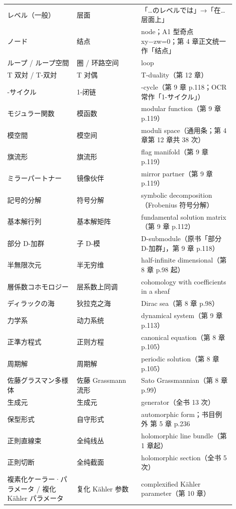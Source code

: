 \begin{longtable}{@{}>{\raggedright\arraybackslash}p{0.29\linewidth}>{\raggedright\arraybackslash}p{0.26\linewidth}>{\raggedright\arraybackslash}p{0.38\linewidth}@{}}
レベル（一般） & \mbox{层面} & 「…のレベルでは」→「在…层面上」 \\
ノード & \mbox{结点} & node；A1 型奇点 xy−zw=0；第 4 章正文统一作「结点」 \\
ループ / ループ空間 & \mbox{圈} / \mbox{环路空间} & loop \\
T 双対 / T-双対 & T \mbox{对偶} & T-duality（第 12 章） \\
1-サイクル & \mbox{1-闭链} & 1-cycle（第 9 章 p.118；OCR 常作「1-サイクル」） \\
モジュラー関数 & \mbox{模函数} & modular function（第 9 章 p.119） \\
模空間 & \mbox{模空间} & moduli space（通用条；第 4 章\textendash{}第 12 章共 38 次） \\
旗流形 & \mbox{旗流形} & flag manifold（第 9 章 p.119） \\
ミラーパートナー & \mbox{镜像伙伴} & mirror partner（第 9 章 p.119） \\
記号的分解 & \mbox{符号分解} & symbolic decomposition（Frobenius 符号分解） \\
基本解行列 & \mbox{基本解矩阵} & fundamental solution matrix（第 9 章 p.112） \\
部分 D-加群 & \mbox{子} \mbox{D-模} & D-submodule（原书「部分 D-加群」，第 9 章 p.118） \\
半無限次元 & \mbox{半无穷维} & half-infinite dimensional（第 8 章 p.98 起） \\
層係数コホモロジー & \mbox{层系数上同调} & cohomology with coefficients in a sheaf \\
ディラックの海 & \mbox{狄拉克之海} & Dirac sea（第 8 章 p.98） \\
力学系 & \mbox{动力系统} & dynamical system（第 9 章 p.113） \\
正準方程式 & \mbox{正则方程} & canonical equation（第 8 章 p.105） \\
周期解 & \mbox{周期解} & periodic solution（第 8 章 p.105） \\
佐藤グラスマン多様体 & \mbox{佐藤} Grassmann \mbox{流形} & Sato Grassmannian（第 8 章 p.99） \\
生成元 & \mbox{生成元} & generator（全书 13 次） \\
保型形式 & \mbox{自守形式} & automorphic form；书目例外 第 5 章 p.236 \\
正則直線束 & \mbox{全纯线丛} & holomorphic line bundle（第 1 章起） \\
正則切断 & \mbox{全纯截面} & holomorphic section（全书 5 次） \\
複素化ケーラー·パラメータ / 複化 Kähler パラメータ & \mbox{复化} Kähler \mbox{参数} & complexified Kähler parameter（第 10 章） \\

\end{longtable}
